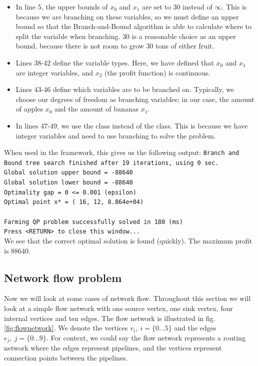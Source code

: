 \begin{itemize}
\item
In line 5, the upper bounds of $x_0$ and $x_1$ are set to 30 instead of $\infty$. This is because we are branching on these variables, so we must define an upper bound so that the Branch-and-Bound algorithm is able to calculate where to split the variable when branching. 30 is a reasonable choice as an upper bound, because there is not room to grow 30 tons of either fruit.
\item
Lines 38-42 define the variable types. Here, we have defined that $x_0$ and $x_1$ are integer variables, and $x_2$ (the profit function) is continuous.
\item
Lines 43-46 define which variables are to be branched on. Typically, we choose our degrees of freedom as branching variables; in our case, the amount of apples $x_0$ and the amount of bananas $x_1$.
\item
In lines 47-49, we use the  class instead of the  class. This is because we have integer variables and need to use branching to solve the problem.
\end{itemize}
When used in the  framework, this gives us the following output:
\newline
{\footnotesize{\texttt{Branch and Bound tree search finished after 19 iterations, using 0 sec.\\
Global solution upper bound = -88640\\
Global solution lower bound = -88640\\
Optimality gap = 0 <= 0.001 (epsilon)\\
Optimal point x* = (    16,     12, 8.864e+04)\\
\\
Farming QP problem successfully solved in 180 (ms)\\
Press <RETURN> to close this window...\\
}}}
We see that the correct optimal solution is found (quickly). The maximum profit is 88640.

\newpage
\subsection{Network flow problem}
Now we will look at some cases of network flow. Throughout this section we will look at a simple flow network with one source vertex, one sink vertex, four internal vertices and ten edges. The flow network is illustrated in fig. \ref{fig:flownetwork}. We denote the vertices $v_i,\ i = \lbrace 0 \dots 5 \rbrace$ and the edges $e_j,\ j = \lbrace 0 \dots 9 \rbrace$. For context, we could say the flow network represents a routing network where the edges represent pipelines, and the vertices represent connection points between the pipelines.

